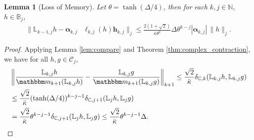\documentclass{amsart}
\numberwithin{equation}{section}
\newtheorem{lem}[thm]{Lemma}
\newcommand\cC{{\mathcal C}}
\newcommand\bB{{\mathbb B}}
\newcommand\bC{{\mathbb C}}
\newcommand\bL{{\mathbb L}}
\newcommand\bN{{\mathbb N}}
\newcommand{\bbm}{\mathbbm m}
\begin{document}
 \begin{lem}[Loss of Memory] 
 \label{lem:memory loss}
 Let $\theta = \tanh(\Delta/4)$, then for each $k,j\in\bN$, $h \in \bB_j$,
 \[
\begin{split}
\| \bL_{k-1,j} h - \boldsymbol{\alpha}_{k,j} & \boldsymbol{\ell}_{k,j}(h) \boldsymbol{h}_{k,j} \|_j
\le  \frac{2(1+\sqrt{2}) }{\bar\kappa \theta^2} \Delta \theta^{k-j} |\boldsymbol{\alpha}_{k,j} |\, \| h\|_j. 
\end{split}
\]
 \end{lem}
 \begin{proof}
 Applying Lemma \ref{lem:compare} and Theorem \ref{thm:complex_contraction}, we have for all $h,g\in\cC_{j}$,
\[
\begin{split}
&\left\|\frac{ \bL_{k,j} h}{\bbm_{k+1}(\bL_{k,j} h)}-\frac{ \bL_{k,j} g}{\bbm_{k+1}(\bL_{k,j}g)}\right\|_{k+1} \leq \frac{\sqrt 2}{\bar \kappa}\delta_{\bC,k}(\bL_{k,j} h,\bL_{k,j} g)\\
&\leq \frac{\sqrt 2}{\bar\kappa} (\tanh(\Delta/4))^{k-j-1}\delta_{\bC, j+1}( \bL_{j} h, \bL_{j} g)\\
& =\frac{\sqrt 2}{\bar\kappa} \theta^{k-j-1}\delta_{\bC,j+1}( \bL_{j}  h, \bL_{j} g)\leq \frac{ \sqrt 2}{\bar\kappa} \theta^{k-j-1}\Delta.
\end{split}
\]



\end{proof}
\end{document}
